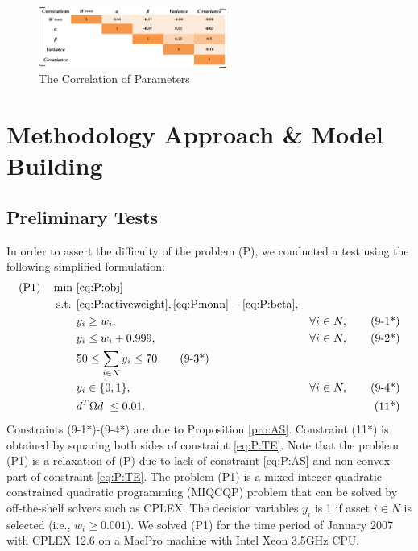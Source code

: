 \documentclass[11pt]{article}
\begin{document}
	\begin{figure}[h] 
		\begin{center}
			\includegraphics[width=0.55\textwidth]{cor}
			\caption{ The Correlation of Parameters } \label{fig:cor}
		\end{center}
	\end{figure}
	
	
	\section*{Methodology Approach {\&} Model Building}
	\setcounter{subsection}{0}
	
	
	\subsection{Preliminary Tests}
	
	In order to assert the difficulty of the problem (P), we conducted a test using the following simplified formulation:
	\begin{align*}
	\text{(P1)} \quad \min~ &\eqref{eq:P:obj}\\
	\text{s.t. } 
	& \eqref{eq:P:activeweight}, \eqref{eq:P:nonn} - \eqref{eq:P:beta}, \notag\\
	& y_i \geq w_i, & \forall i \in N, \tag{9-1*}\\
	& y_i \leq w_i + 0.999, & \forall i \in N, \tag{9-2*}\\
	& 50 \leq \sum_{i \in N} y_i \leq 70 \tag{9-3*}\\
	& y_i \in \{0,1\}, & \forall i \in N, \tag{9-4*}\\
	&  d^T \Omega  d \  \leq 0.01. & \tag{11*}
	\end{align*} 
	Constraints (9-1*)-(9-4*) are due to Proposition \ref{pro:AS}. Constraint (11*) is obtained by squaring both sides of constraint \eqref{eq:P:TE}. Note that the problem (P1) is a relaxation of (P) due to lack of constraint \eqref{eq:P:AS} and non-convex part of constraint \eqref{eq:P:TE}. The problem (P1) is a mixed integer quadratic constrained quadratic programming (MIQCQP) problem that can be solved by off-the-shelf solvers such as CPLEX. The decision variables $y_i$ is 1 if asset $i \in N$ is selected (i.e., $w_i \ge 0.001$). We solved (P1) for the time period of January 2007 with CPLEX 12.6 on a MacPro machine with Intel Xeon 3.5GHz CPU. 
	
\end{document}
